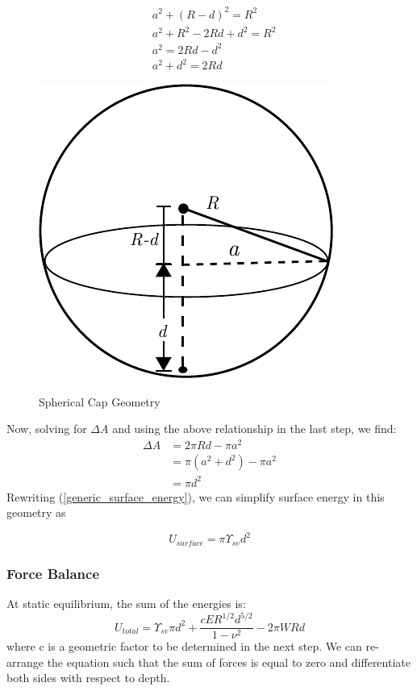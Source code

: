 \begin{figure}
	\begin{minipage}{.5\textwidth}
	\begin{align*}
	&a^2 + (R-d)^2 = R^2 \\
	&a^2 + R^2 - 2Rd +d^2 = R^2 \\
	&a^2 = 2Rd -d^2 \\
	&a^2 + d^2 = 2Rd
	\end{align*}
	\end{minipage}%
	\begin{minipage}{.5\textwidth}
	\centering
	\caption{Spherical Cap Geometry}
	\includegraphics[width=.5\linewidth]{Chapters/Figures/SphericalCap}
	\label{fig:sphericalcap}
	\end{minipage}
\end{figure}
Now, solving for $ \Delta A $ and using the above relationship in the last step, we find:
\begin{align*}
\Delta A &= 2\pi Rd - \pi a^2 \\
&= \pi(a^2+d^2) - \pi a^2 \\
&= \pi d^2
\end{align*}
 Rewriting (\ref{generic_surface_energy}), we can simplify surface energy in this geometry as 
 
 \begin{equation}
 \label{surface_energy}
 U_{surface} = \pi \Upsilon_{sv} d^2
 \end{equation}

\subsubsection{Force Balance}
At static equilibrium, the sum of the energies is:
\[U_{total} = \Upsilon_{sv} \pi d^2 + \frac{cER^{1/2}d^{5/2}}{1-\nu^2} - 2\pi W R d\] 
where c is a geometric factor to be determined in the next step. We can re-arrange the equation such that the sum of forces is equal to zero and differentiate both sides with respect to depth.

